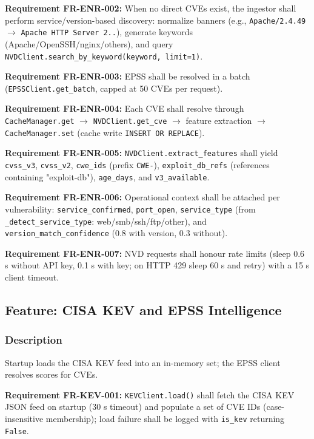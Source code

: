 \documentclass[10pt,journal,onecolumn]{IEEEtran}
\newcommand{\reqid}[1]{\textbf{#1}}
\begin{document}
\reqid{Requirement FR-ENR-002:} When no direct CVEs exist, the ingestor shall perform service/version-based discovery: normalize banners (e.g., \texttt{Apache/2.4.49} $\rightarrow$ \texttt{Apache HTTP Server 2..}), generate keywords (Apache/OpenSSH/nginx/others), and query \texttt{NVDClient.\allowbreak search\_\allowbreak by\_\allowbreak keyword(keyword, limit=1)}.

\reqid{Requirement FR-ENR-003:} EPSS shall be resolved in a batch (\texttt{EPSSClient.get\_batch}, capped at 50 CVEs per request).

\reqid{Requirement FR-ENR-004:} Each CVE shall resolve through \texttt{CacheManager.get} $\rightarrow$ \texttt{NVDClient.get\_cve} $\rightarrow$ feature extraction $\rightarrow$ \texttt{CacheManager.set} (cache write \texttt{INSERT OR REPLACE}).

\reqid{Requirement FR-ENR-005:} \texttt{NVDClient.\allowbreak extract\_\allowbreak features} shall yield \texttt{cvss\_v3}, \texttt{cvss\_v2}, \texttt{cwe\_ids} (prefix \texttt{CWE-}), \texttt{exploit\_db\_refs} (references containing "exploit-db"), \texttt{age\_days}, and \texttt{v3\_available}.

\reqid{Requirement FR-ENR-006:} Operational context shall be attached per vulnerability: \texttt{service\_confirmed}, \texttt{port\_open}, \texttt{service\_type} (from \texttt{\_detect\_service\_type}: web/smb/ssh/ftp/other), and \texttt{version\_\allowbreak match\_\allowbreak confidence} (0.8 with version, 0.3 without).

\reqid{Requirement FR-ENR-007:} NVD requests shall honour rate limits (sleep 0.6 s without API key, 0.1 s with key; on HTTP 429 sleep 60 s and retry) with a 15 s client timeout.

\subsection{Feature: CISA KEV and EPSS Intelligence}

\subsubsection{Description}

Startup loads the CISA KEV feed into an in-memory set; the EPSS client resolves scores for CVEs.

\reqid{Requirement FR-KEV-001:} \texttt{KEVClient.load()} shall fetch the CISA KEV JSON feed on startup (30 s timeout) and populate a set of CVE IDs (case-insensitive membership); load failure shall be logged with \texttt{is\_kev} returning \texttt{False}.
\end{document}

